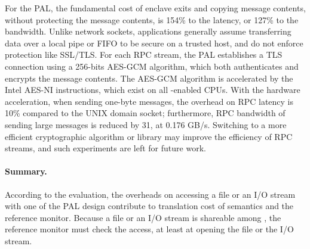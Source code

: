For the \sgx{} PAL,
the fundamental cost of enclave exits and copying message contents,
without protecting the message contents,
is \roughly{}154\% to the latency,
or \roughly{}127\% to the bandwidth.
Unlike network sockets, 
applications generally assume transferring data over a local pipe or FIFO to be secure on a trusted host, and do not enforce protection like SSL/TLS.
For each RPC stream, the \sgx{} PAL establishes a TLS connection using a 256-bits AES-GCM algorithm, which both authenticates and encrypts the message contents.
The AES-GCM algorithm is accelerated by the Intel AES-NI instructions, which exist on all \sgx{}-enabled CPUs.
With the hardware acceleration,
when sending one-byte messages,
the overhead on RPC latency is \roughly{}10\% compared to the UNIX domain socket;
furthermore, RPC bandwidth of sending large messages
is reduced by \roughly{}31\x{}, at \roughly{}0.176 GB/s.
Switching to a more efficient cryptographic algorithm or library may improve the efficiency of RPC streams,
and such experiments are left for future work.






\paragraph{Summary.}
According to the evaluation, the overheads on accessing a file or an I/O stream
with one of the PAL design
contribute to translation cost of \thehostabi{} semantics
and the reference monitor.
Because a file or an I/O stream
is shareable among \picoprocs{}, the reference monitor
must check the access, at least
at opening the file or the I/O stream.





